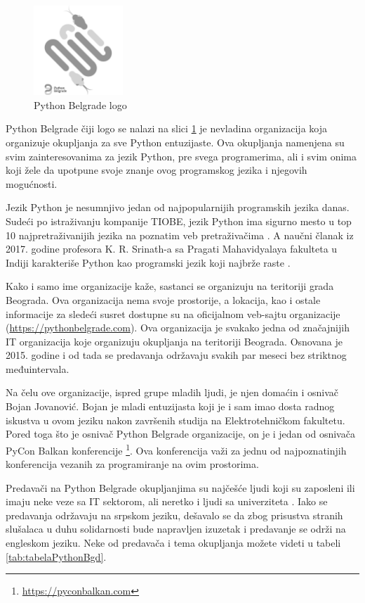 \documentclass[a4paper]{article}
\begin{document}
{\begin{figure}[H]
  \centering
  \includegraphics[width=0.3\textwidth]{pybgd.png}
  \caption{Python Belgrade logo}
  \label{fig:Pythonlogo}
\end{figure}

Python Belgrade čiji logo se nalazi na slici \ref{fig:Pythonlogo} je nevladina organizacija koja organizuje okupljanja za sve Python entuzijaste. Ova okupljanja namenjena su svim
zainteresovanima za jezik Python, pre svega programerima, ali i svim onima koji žele da upotpune svoje znanje ovog programskog jezika i njegovih mogućnosti.

Jezik Python je nesumnjivo jedan od najpopularnijih programskih jezika danas. Sudeći po istraživanju kompanije TIOBE, jezik Python ima sigurno mesto u top 10 najpretraživanijih jezika na poznatim veb pretraživačima \cite{pythonPopular}. A naučni članak iz 2017. godine profesora K. R. Srinath-a sa Pragati Mahavidyalaya fakulteta u Indiji karakteriše Python kao programski jezik koji najbrže raste \cite{pythonFastGrow}.

Kako i samo ime organizacije kaže, sastanci se organizuju na teritoriji grada Beograda. Ova organizacija nema svoje prostorije, a lokacija, kao i ostale informacije
za sledeći susret dostupne su na oficijalnom veb-sajtu organizacije (\url{https://pythonbelgrade.com}). Ova organizacija je svakako jedna od značajnijih IT organizacija koje organizuju okupljanja na teritoriji Beograda. Osnovana je 2015. godine i od tada se predavanja održavaju svakih par meseci bez striktnog međuintervala. 

Na čelu ove organizacije, ispred grupe mladih ljudi, je njen domaćin i osnivač Bojan Jovanović. Bojan je mladi entuzijasta koji je i sam imao dosta radnog iskustva u ovom jeziku nakon završenih studija na
Elektrotehničkom fakultetu. Pored toga što je osnivač Python Belgrade organizacije, on je i jedan od osnivača PyCon Balkan konferencije \footnote{\url{https://pyconbalkan.com}}. Ova konferencija važi za jednu od najpoznatinjih konferencija vezanih za programiranje na ovim prostorima.

Predavači na Python Belgrade okupljanjima su najčešće ljudi koji su zaposleni ili imaju neke veze sa IT sektorom, ali neretko i ljudi sa univerziteta \cite{pybgdSpeakers}. Iako se predavanja održavaju na srpskom jeziku, dešavalo se da zbog prisustva stranih slušalaca u duhu solidarnosti bude napravljen izuzetak i predavanje se održi na engleskom jeziku. Neke od predavača i tema okupljanja možete videti u tabeli \ref{tab:tabelaPythonBgd}.

}
\end{document}

